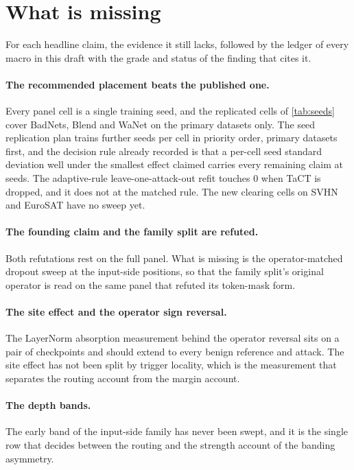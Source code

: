 \documentclass[../main.tex]{subfiles}
\begin{document}
\section{What is missing}
\label{sec:missing}

For each headline claim, the evidence it still lacks, followed by the ledger of every macro in this draft with the grade and status of the finding that cites it.

\paragraph{The recommended placement beats the published one.} Every panel cell is a single training seed, and the \SeedCells{} replicated cells of \cref{tab:seeds} cover BadNets, Blend and WaNet on the primary datasets only. The seed replication plan trains further seeds per cell in priority order, primary datasets first, and the decision rule already recorded is that a per-cell seed standard deviation well under the smallest effect claimed carries every remaining claim at \SeedsPerCell{} seeds. The adaptive-rule leave-one-attack-out refit touches $0$ when TaCT is dropped, and it does not at the matched rule. The \PanelCellsAwaitingSweep{} new clearing cells on SVHN and EuroSAT have no sweep yet.

\paragraph{The founding claim and the family split are refuted.} Both refutations rest on the full panel. What is missing is the operator-matched dropout sweep at the input-side positions, so that the family split's original operator is read on the same panel that refuted its token-mask form.

\paragraph{The site effect and the operator sign reversal.} The LayerNorm absorption measurement behind the operator reversal sits on a pair of checkpoints and should extend to every benign reference and attack. The site effect has not been split by trigger locality, which is the measurement that separates the routing account from the margin account.

\paragraph{The depth bands.} The early band of the input-side family has never been swept, and it is the single row that decides between the routing and the strength account of the banding asymmetry.
\end{document}
